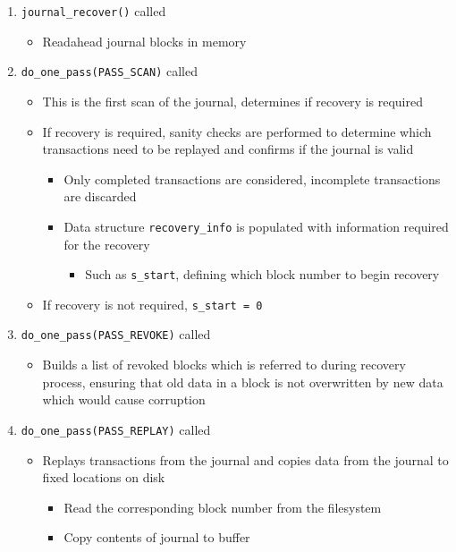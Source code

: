 \begin{enumerate}
\item \texttt{journal_recover()} called
	\begin{itemize}
	\item Readahead journal blocks in memory
	\end{itemize}
\item \texttt{do_one_pass(PASS_SCAN)} called
	\begin{itemize}
	\item This is the first scan of the journal, determines if recovery is required
	\item If recovery is required, sanity checks are performed to determine which transactions need to be replayed and confirms if the journal is valid
		\begin{itemize}
		\item Only completed transactions are considered, incomplete transactions are discarded \citep{Bovet2006}
		\item Data structure \texttt{recovery_info} is populated with information required for the recovery
			\begin{itemize}
			\item Such as \texttt{s_start}, defining which block number to begin recovery
			\end{itemize}
		\end{itemize}
	\item If recovery is not required, \texttt{s_start = 0}
	\end{itemize}
\item \texttt{do_one_pass(PASS_REVOKE)} called
	\begin{itemize}
	\item Builds a list of revoked blocks which is referred to during recovery process, ensuring that old data in a block is not overwritten by new data which would cause corruption
	\end{itemize}
\item \texttt{do_one_pass(PASS_REPLAY)} called
	\begin{itemize}
	\item Replays transactions from the journal and copies data from the journal to fixed locations on disk
		\begin{itemize}
			\item Read the corresponding block number from the filesystem
			\item Copy contents of journal to buffer

\end{itemize}
\end{itemize}
\end{enumerate}
